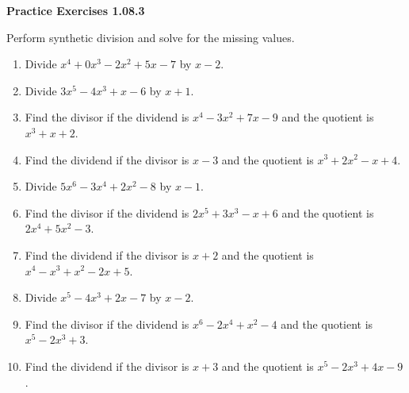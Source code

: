 \vspace{0.3ex}
\noindent\textbf{Practice Exercises 1.08.3}

\vspace{0.2ex}

Perform synthetic division and solve for the missing values.
\begin{enumerate}
    \item Divide \(x^4 + 0x^3 - 2x^2 + 5x - 7\) by \(x - 2\).
    \item Divide \(3x^5 - 4x^3 + x - 6\) by \(x + 1\).
    \item Find the divisor if the dividend is \(x^4 - 3x^2 + 7x - 9\) and the quotient is \(x^3 + x + 2\).
    \item Find the dividend if the divisor is \(x - 3\) and the quotient is \(x^3 + 2x^2 - x + 4\).
    \item Divide \(5x^6 - 3x^4 + 2x^2 - 8\) by \(x - 1\).
    \item Find the divisor if the dividend is \(2x^5 + 3x^3 - x + 6\) and the quotient is \(2x^4 + 5x^2 - 3\).
    \item Find the dividend if the divisor is \(x + 2\) and the quotient is \(x^4 - x^3 + x^2 - 2x + 5\).
    \item Divide \(x^5 - 4x^3 + 2x - 7\) by \(x - 2\).
    \item Find the divisor if the dividend is \(x^6 - 2x^4 + x^2 - 4\) and the quotient is \(x^5 - 2x^3 + 3\).
    \item Find the dividend if the divisor is \(x + 3\) and the quotient is \(x^5 - 2x^3 + 4x - 9\).
\end{enumerate}
